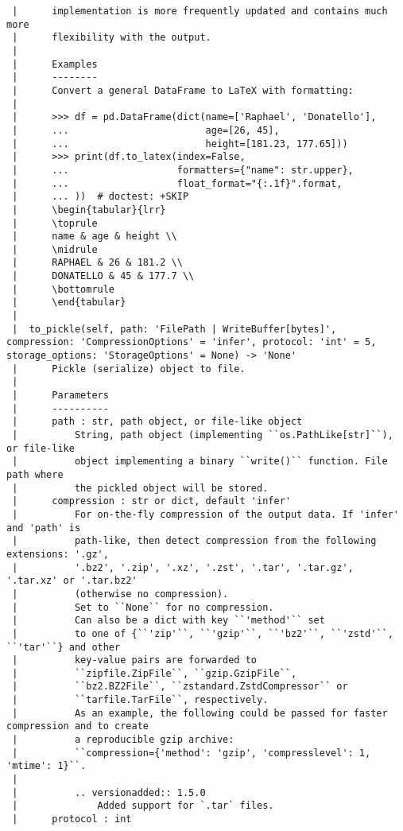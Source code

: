 \documentclass[
  letterpaper,
  DIV=11,
  numbers=noendperiod]{scrreprt}
\begin{document}
\begin{verbatim}
 |      implementation is more frequently updated and contains much more
 |      flexibility with the output.
 |      
 |      Examples
 |      --------
 |      Convert a general DataFrame to LaTeX with formatting:
 |      
 |      >>> df = pd.DataFrame(dict(name=['Raphael', 'Donatello'],
 |      ...                        age=[26, 45],
 |      ...                        height=[181.23, 177.65]))
 |      >>> print(df.to_latex(index=False,
 |      ...                   formatters={"name": str.upper},
 |      ...                   float_format="{:.1f}".format,
 |      ... ))  # doctest: +SKIP
 |      \begin{tabular}{lrr}
 |      \toprule
 |      name & age & height \\
 |      \midrule
 |      RAPHAEL & 26 & 181.2 \\
 |      DONATELLO & 45 & 177.7 \\
 |      \bottomrule
 |      \end{tabular}
 |  
 |  to_pickle(self, path: 'FilePath | WriteBuffer[bytes]', compression: 'CompressionOptions' = 'infer', protocol: 'int' = 5, storage_options: 'StorageOptions' = None) -> 'None'
 |      Pickle (serialize) object to file.
 |      
 |      Parameters
 |      ----------
 |      path : str, path object, or file-like object
 |          String, path object (implementing ``os.PathLike[str]``), or file-like
 |          object implementing a binary ``write()`` function. File path where
 |          the pickled object will be stored.
 |      compression : str or dict, default 'infer'
 |          For on-the-fly compression of the output data. If 'infer' and 'path' is
 |          path-like, then detect compression from the following extensions: '.gz',
 |          '.bz2', '.zip', '.xz', '.zst', '.tar', '.tar.gz', '.tar.xz' or '.tar.bz2'
 |          (otherwise no compression).
 |          Set to ``None`` for no compression.
 |          Can also be a dict with key ``'method'`` set
 |          to one of {``'zip'``, ``'gzip'``, ``'bz2'``, ``'zstd'``, ``'tar'``} and other
 |          key-value pairs are forwarded to
 |          ``zipfile.ZipFile``, ``gzip.GzipFile``,
 |          ``bz2.BZ2File``, ``zstandard.ZstdCompressor`` or
 |          ``tarfile.TarFile``, respectively.
 |          As an example, the following could be passed for faster compression and to create
 |          a reproducible gzip archive:
 |          ``compression={'method': 'gzip', 'compresslevel': 1, 'mtime': 1}``.
 |      
 |          .. versionadded:: 1.5.0
 |              Added support for `.tar` files.
 |      protocol : int

\end{verbatim}
\end{document}
